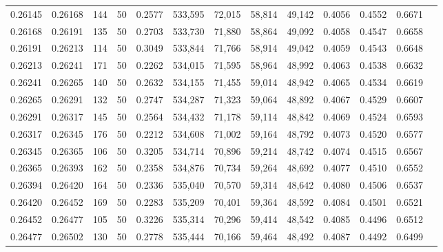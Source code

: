 \begin{tabular}{rrrrrrrrrrrrr}
0.26145 & 0.26168 &   144 &  50 &                                     0.2577 & 533,595 &  72,015 &  58,814 &  49,142 & 0.4056 & 0.4552 & 0.6671 \\
0.26168 & 0.26191 &   135 &  50 &                                     0.2703 & 533,730 &  71,880 &  58,864 &  49,092 & 0.4058 & 0.4547 & 0.6658 \\
0.26191 & 0.26213 &   114 &  50 &                                     0.3049 & 533,844 &  71,766 &  58,914 &  49,042 & 0.4059 & 0.4543 & 0.6648 \\
0.26213 & 0.26241 &   171 &  50 &                                     0.2262 & 534,015 &  71,595 &  58,964 &  48,992 & 0.4063 & 0.4538 & 0.6632 \\
0.26241 & 0.26265 &   140 &  50 &                                     0.2632 & 534,155 &  71,455 &  59,014 &  48,942 & 0.4065 & 0.4534 & 0.6619 \\
0.26265 & 0.26291 &   132 &  50 &                                     0.2747 & 534,287 &  71,323 &  59,064 &  48,892 & 0.4067 & 0.4529 & 0.6607 \\
0.26291 & 0.26317 &   145 &  50 &                                     0.2564 & 534,432 &  71,178 &  59,114 &  48,842 & 0.4069 & 0.4524 & 0.6593 \\
0.26317 & 0.26345 &   176 &  50 &                                     0.2212 & 534,608 &  71,002 &  59,164 &  48,792 & 0.4073 & 0.4520 & 0.6577 \\
0.26345 & 0.26365 &   106 &  50 &                                     0.3205 & 534,714 &  70,896 &  59,214 &  48,742 & 0.4074 & 0.4515 & 0.6567 \\
0.26365 & 0.26393 &   162 &  50 &                                     0.2358 & 534,876 &  70,734 &  59,264 &  48,692 & 0.4077 & 0.4510 & 0.6552 \\
0.26394 & 0.26420 &   164 &  50 &                                     0.2336 & 535,040 &  70,570 &  59,314 &  48,642 & 0.4080 & 0.4506 & 0.6537 \\
0.26420 & 0.26452 &   169 &  50 &                                     0.2283 & 535,209 &  70,401 &  59,364 &  48,592 & 0.4084 & 0.4501 & 0.6521 \\
0.26452 & 0.26477 &   105 &  50 &                                     0.3226 & 535,314 &  70,296 &  59,414 &  48,542 & 0.4085 & 0.4496 & 0.6512 \\
0.26477 & 0.26502 &   130 &  50 &                                     0.2778 & 535,444 &  70,166 &  59,464 &  48,492 & 0.4087 & 0.4492 & 0.6499 \\

\end{tabular}
